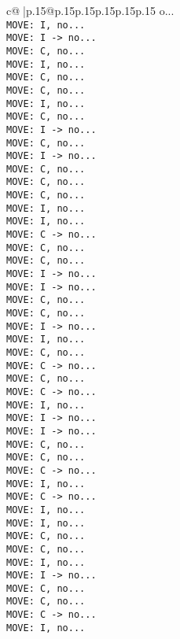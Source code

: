 \documentclass{article}
\begin{document}
{\begin{supertabular}{c@{$\;$}|p{.15\linewidth}@{}p{.15\linewidth}p{.15\linewidth}p{.15\linewidth}p{.15\linewidth}p{.15\linewidth}}
{{{o...\\ \tt  MOVE: I, no...\\ \tt  MOVE: I -> no...\\ \tt  MOVE: C, no...\\ \tt  MOVE: I, no...\\ \tt  MOVE: C, no...\\ \tt  MOVE: C, no...\\ \tt  MOVE: I, no...\\ \tt  MOVE: C, no...\\ \tt  MOVE: I -> no...\\ \tt  MOVE: C, no...\\ \tt  MOVE: I -> no...\\ \tt  MOVE: C, no...\\ \tt  MOVE: C, no...\\ \tt  MOVE: C, no...\\ \tt  MOVE: I, no...\\ \tt  MOVE: I, no...\\ \tt  MOVE: C -> no...\\ \tt  MOVE: C, no...\\ \tt  MOVE: C, no...\\ \tt  MOVE: I -> no...\\ \tt  MOVE: I -> no...\\ \tt  MOVE: C, no...\\ \tt  MOVE: C, no...\\ \tt  MOVE: I -> no...\\ \tt  MOVE: I, no...\\ \tt  MOVE: C, no...\\ \tt  MOVE: C -> no...\\ \tt  MOVE: C, no...\\ \tt  MOVE: C -> no...\\ \tt  MOVE: I, no...\\ \tt  MOVE: I -> no...\\ \tt  MOVE: I -> no...\\ \tt  MOVE: C, no...\\ \tt  MOVE: C, no...\\ \tt  MOVE: C -> no...\\ \tt  MOVE: I, no...\\ \tt  MOVE: C -> no...\\ \tt  MOVE: I, no...\\ \tt  MOVE: I, no...\\ \tt  MOVE: C, no...\\ \tt  MOVE: C, no...\\ \tt  MOVE: I, no...\\ \tt  MOVE: I -> no...\\ \tt  MOVE: C, no...\\ \tt  MOVE: C, no...\\ \tt  MOVE: C -> no...\\ \tt  MOVE: I, no...\\ }}}
\end{supertabular}}
\end{document}
